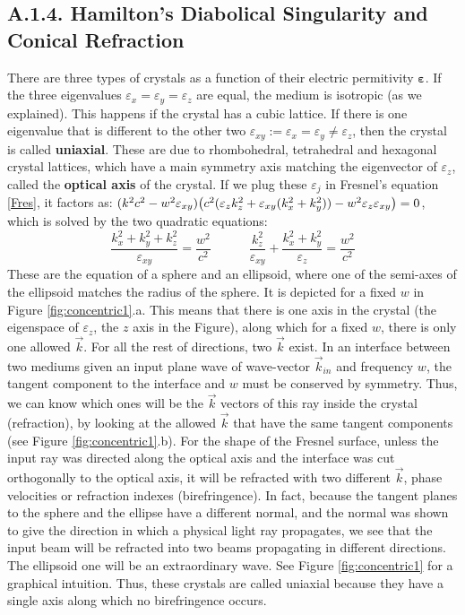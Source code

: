\documentclass[11pt, a4paper, twoside]{article} %
\begin{document}
\subsection*{A.1.4. Hamilton's Diabolical Singularity and Conical Refraction\vspace{-0.2cm}}
There are three types of crystals as a function of their electric permitivity $\pmb{\varepsilon}$. If the three eigenvalues $\varepsilon_x=\varepsilon_y=\varepsilon_z$ are equal, the medium is isotropic (as we explained). This happens if the crystal has a cubic lattice. If there is one eigenvalue that is different to the other two $\varepsilon_{xy}:=\varepsilon_x=\varepsilon_y\neq \varepsilon_z$, then the crystal is called {\bf uniaxial}. These are due to rhombohedral, tetrahedral and hexagonal crystal lattices, which have a main symmetry axis matching the eigenvector of $\varepsilon_z$, called the {\bf optical axis} of the crystal. If we plug these $\varepsilon_j$ in Fresnel's equation \eqref{Fres}, it factors as: $(k^2c^2-w^2\varepsilon_{xy})\qty(c^2(\varepsilon_zk_z^2+\varepsilon_{xy}(k_x^2+k_y^2))-w^2\varepsilon_z\varepsilon_{xy})=0$, which is solved by the two quadratic equations:
\begin{equation}
\frac{k_x^2+k_y^2+k_z^2}{\varepsilon_{xy}}=\frac{w^2}{c^2} \quad \quad \quad \frac{k_z^2}{\varepsilon_{xy}}+\frac{k_x^2+k_y^2}{\varepsilon_z}=\frac{w^2}{c^2}
\end{equation}
These are the equation of a sphere and an ellipsoid, where one of the semi-axes of the ellipsoid matches the radius of the sphere. It is depicted for a fixed $w$ in Figure \ref{fig:concentric1}.a. This means that there is one axis in the crystal (the eigenspace of $\varepsilon_z$, the $z$ axis in the Figure), along which for a fixed $w$, there is only one allowed $\vec{k}$. For all the rest of directions, two $\vec{k}$ exist. In an interface between two mediums given an input plane wave of wave-vector $\vec{k}_{in}$ and frequency $w$, the tangent component to the interface and $w$ must be conserved by symmetry. Thus, we can know which ones will be the $\vec{k}$ vectors of this ray inside the crystal (refraction), by looking at the allowed $\vec{k}$ that have the same tangent components (see Figure \ref{fig:concentric1}.b). For the shape of the Fresnel surface, unless the input ray was directed along the optical axis and the interface was cut orthogonally to the optical axis, it will be refracted with two different $\vec{k}$, phase velocities or refraction indexes (birefringence). In fact, because the tangent planes to the sphere and the ellipse have a different normal, and the normal was shown to give the direction in which a physical light ray propagates, we see that the input beam will be refracted into two beams propagating in different directions. The ellipsoid one will be an extraordinary wave. See Figure \ref{fig:concentric1} for a graphical intuition. Thus, these crystals are called uniaxial because they have a single axis along which no birefringence occurs.\vspace{-0.3cm}
\end{document}
